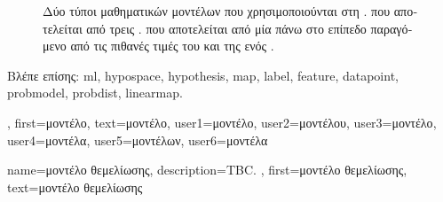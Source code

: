 {{\begin{figure}[H]
		{
		\caption{\foreignlanguage{greek}{Δύο τύποι μαθηματικών μοντέλων που χρησιμοποιούνται στη} . 
			  \foreignlanguage{greek}{που αποτελείται από τρεις} 
			.   
			\foreignlanguage{greek}{που αποτελείται από μία}  \foreignlanguage{greek}{πάνω στο επίπεδο 
			παραγόμενο από τις πιθανές τιμές του}  \foreignlanguage{greek}{και της}  
			\foreignlanguage{greek}{ενός} . \label{fig_model_dict}} }
		\end{figure}
		\foreignlanguage{greek}{Βλέπε επίσης:} \gls{ml}, \gls{hypospace}, \gls{hypothesis}, \gls{map}, \gls{label}, 
		\gls{feature}, \gls{datapoint}, \gls{probmodel}, \gls{probdist}, \gls{linearmap}.},
	first={\foreignlanguage{greek}{μοντέλο}},
	text={\foreignlanguage{greek}{μοντέλο}},
	user1={\foreignlanguage{greek}{μοντέλο}}, %
	user2={\foreignlanguage{greek}{μοντέλου}}, %
	user3={\foreignlanguage{greek}{μοντέλο}}, %
	user4={\foreignlanguage{greek}{μοντέλα}}, %
	user5={\foreignlanguage{greek}{μοντέλων}}, %
	user6={\foreignlanguage{greek}{μοντέλα}} %
}

{name={\foreignlanguage{greek}{μοντέλο θεμελίωσης}},
	description={TBC. },
	first={\foreignlanguage{greek}{μοντέλο θεμελίωσης}},
	text={\foreignlanguage{greek}{μοντέλο θεμελίωσης}}
} 

